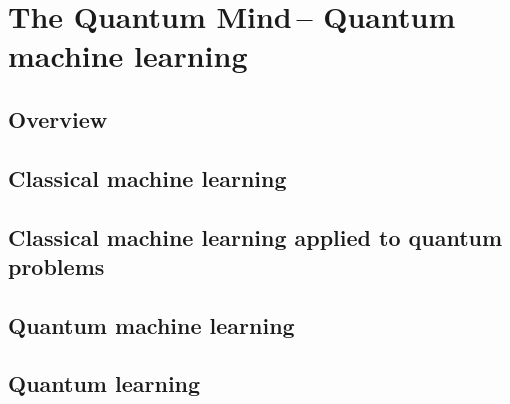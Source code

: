 %
%

\section{The Quantum Mind\texttrademark\,-- Quantum machine learning}\label{sec:quantum_mind}

\cite{bib:lloyd2013quantum}


\subsection{Overview}

\subsection{Classical machine learning}

\subsection{Classical machine learning applied to quantum problems}

\subsection{Quantum machine learning}

\subsection{Quantum learning}
